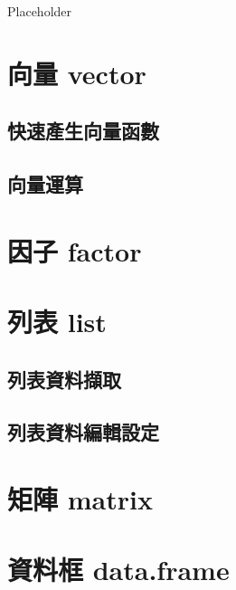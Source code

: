 \documentclass[]{book}
\begin{document}
Placeholder

\hypertarget{ux5411ux91cf-vector}{%
\section{向量 vector}\label{ux5411ux91cf-vector}}

\hypertarget{ux5febux901fux7522ux751fux5411ux91cfux51fdux6578}{%
\subsection{快速產生向量函數}\label{ux5febux901fux7522ux751fux5411ux91cfux51fdux6578}}

\hypertarget{ux5411ux91cfux904bux7b97}{%
\subsection{向量運算}\label{ux5411ux91cfux904bux7b97}}

\hypertarget{ux56e0ux5b50-factor}{%
\section{因子 factor}\label{ux56e0ux5b50-factor}}

\hypertarget{ux5217ux8868-list}{%
\section{列表 list}\label{ux5217ux8868-list}}

\hypertarget{ux5217ux8868ux8cc7ux6599ux64f7ux53d6}{%
\subsection{列表資料擷取}\label{ux5217ux8868ux8cc7ux6599ux64f7ux53d6}}

\hypertarget{ux5217ux8868ux8cc7ux6599ux7de8ux8f2fux8a2dux5b9a}{%
\subsection{列表資料編輯設定}\label{ux5217ux8868ux8cc7ux6599ux7de8ux8f2fux8a2dux5b9a}}

\hypertarget{ux77e9ux9663-matrix}{%
\section{矩陣 matrix}\label{ux77e9ux9663-matrix}}

\hypertarget{ux8cc7ux6599ux6846-data.frame}{%
\section{資料框 data.frame}\label{ux8cc7ux6599ux6846-data.frame}}
\end{document}

